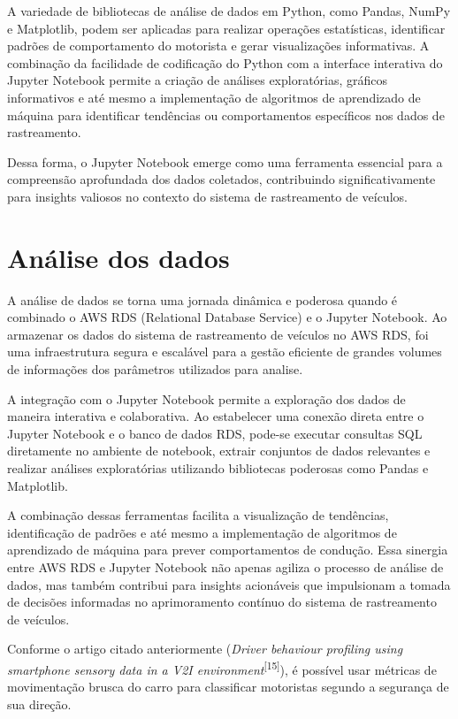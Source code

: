 A variedade de bibliotecas de análise de dados em Python, como Pandas, NumPy e Matplotlib, podem ser aplicadas para realizar operações estatísticas, identificar padrões de comportamento do motorista e gerar visualizações informativas. A combinação da facilidade de codificação do Python com a interface interativa do Jupyter Notebook permite a criação de análises exploratórias, gráficos informativos e até mesmo a implementação de algoritmos de aprendizado de máquina para identificar tendências ou comportamentos específicos nos dados de rastreamento. 

Dessa forma, o Jupyter Notebook emerge como uma ferramenta essencial para a compreensão aprofundada dos dados coletados, contribuindo significativamente para insights valiosos no contexto do sistema de rastreamento de veículos.

\section{Análise dos dados}
A análise de dados se torna uma jornada dinâmica e poderosa quando é combinado o AWS RDS (Relational Database Service) e o Jupyter Notebook. Ao armazenar os dados do sistema de rastreamento de veículos no AWS RDS, foi uma infraestrutura segura e escalável para a gestão eficiente de grandes volumes de informações dos parâmetros utilizados para analise. 

A integração com o Jupyter Notebook permite a exploração dos dados de maneira interativa e colaborativa. Ao estabelecer uma conexão direta entre o Jupyter Notebook e o banco de dados RDS, pode-se executar consultas SQL diretamente no ambiente de notebook, extrair conjuntos de dados relevantes e realizar análises exploratórias utilizando bibliotecas poderosas como Pandas e Matplotlib. 

A combinação dessas ferramentas facilita a visualização de tendências, identificação de padrões e até mesmo a implementação de algoritmos de aprendizado de máquina para prever comportamentos de condução. Essa sinergia entre AWS RDS e Jupyter Notebook não apenas agiliza o processo de análise de dados, mas também contribui para insights acionáveis que impulsionam a tomada de decisões informadas no aprimoramento contínuo do sistema de rastreamento de veículos.

Conforme o artigo citado anteriormente (\textit{Driver behaviour profiling using smartphone sensory data in a V2I environment}\textsuperscript{[15]}), é possível usar métricas de movimentação brusca do carro para classificar motoristas segundo a segurança de sua direção.

